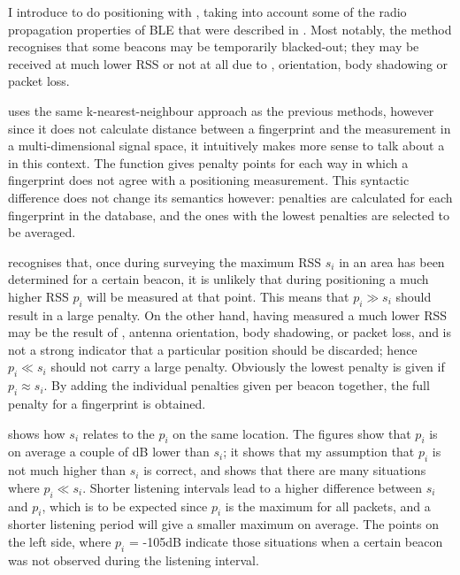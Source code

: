 I introduce \BRP to do positioning with \BLE, taking into account some of the radio propagation properties of BLE that were described in . 
Most notably, the method recognises that some beacons may be temporarily blacked-out; they may be received at much lower RSS or not at all due to \mpi, orientation, body shadowing or packet loss.

\aBRP uses the same k-nearest-neighbour approach as the previous methods, however since it does not calculate distance between a fingerprint and the measurement in a multi-dimensional signal space, it intuitively makes more sense to talk about a  in this context.
The function gives penalty points for each way in which a fingerprint does not agree with a positioning measurement.
This syntactic difference does not change its semantics however: penalties are calculated for each fingerprint in the database, and the ones with the lowest penalties are selected to be averaged.

\BRP recognises that, once during surveying the maximum RSS $s_i$ in an area has been determined for a certain beacon, it is unlikely that during positioning a much higher RSS $p_i$ will be measured at that point.
This means that $p_i \gg s_i$ should result in a large penalty.
On the other hand, having measured a much lower RSS may be the result of \mpi, antenna orientation, body shadowing, or packet loss, and is not a strong indicator that a particular position should be discarded; hence $p_i \ll s_i$ should not carry a large penalty.
Obviously the lowest penalty is given if $p_i \approx s_i$.
By adding the individual penalties given per beacon together, the full penalty for a fingerprint is obtained.

 shows how $s_i$ relates to the $p_i$ on the same location.
The figures show that $p_i$ is on average a couple of dB lower than $s_i$; it shows that my assumption that $p_i$ is not much higher than $s_i$ is correct, and shows that there are many situations where $p_i \ll s_i$.
Shorter listening intervals lead to a higher difference between $s_i$ and $p_i$, which is to be expected since $p_i$ is the maximum for all packets, and a shorter listening period will give a smaller maximum on average.
The points on the left side, where $p_i$ = -105dB indicate those situations when a certain beacon was not observed during the listening interval.


